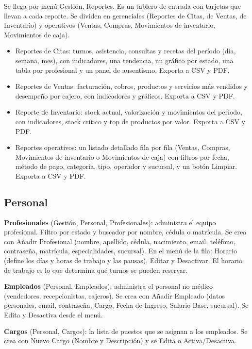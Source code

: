 Se llega por menú Gestión, Reportes. Es un tablero de entrada con tarjetas que llevan a cada reporte. Se dividen en gerenciales (Reportes de Citas, de Ventas, de Inventario) y operativos (Ventas, Compras, Movimientos de inventario, Movimientos de caja).

\begin{itemize}
  \item Reportes de Citas: turnos, asistencia, consultas y recetas del período (día, semana, mes), con indicadores, una tendencia, un gráfico por estado, una tabla por profesional y un panel de ausentismo. Exporta a CSV y PDF.
  \item Reportes de Ventas: facturación, cobros, productos y servicios más vendidos y desempeño por cajero, con indicadores y gráficos. Exporta a CSV y PDF.
  \item Reporte de Inventario: stock actual, valorización y movimientos del período, con indicadores, stock crítico y top de productos por valor. Exporta a CSV y PDF.
  \item Reportes operativos: un listado detallado fila por fila (Ventas, Compras, Movimientos de inventario o Movimientos de caja) con filtros por fecha, método de pago, categoría, tipo, operador y sucursal, y un botón Limpiar. Exporta a CSV y PDF.
\end{itemize}

\subsection{Personal}
\label{sec:mu-personal}

\textbf{Profesionales} (Gestión, Personal, Profesionales): administra el equipo profesional. Filtro por estado y buscador por nombre, cédula o matrícula. Se crea con Añadir Profesional (nombre, apellido, cédula, nacimiento, email, teléfono, contraseña, matrícula, especialidades, sucursal). En el menú de la fila: Horario (define los días y horas de trabajo y las pausas), Editar y Desactivar. El horario de trabajo es lo que determina qué turnos se pueden reservar.

\textbf{Empleados} (Personal, Empleados): administra el personal no médico (vendedores, recepcionistas, cajeros). Se crea con Añadir Empleado (datos personales, email, contraseña, Cargo, Fecha de Ingreso, Salario Base, sucursal). Se Edita y Desactiva desde el menú.

\textbf{Cargos} (Personal, Cargos): la lista de puestos que se asignan a los empleados. Se crea con Nuevo Cargo (Nombre y Descripción) y se Edita o Activa/Desactiva.

